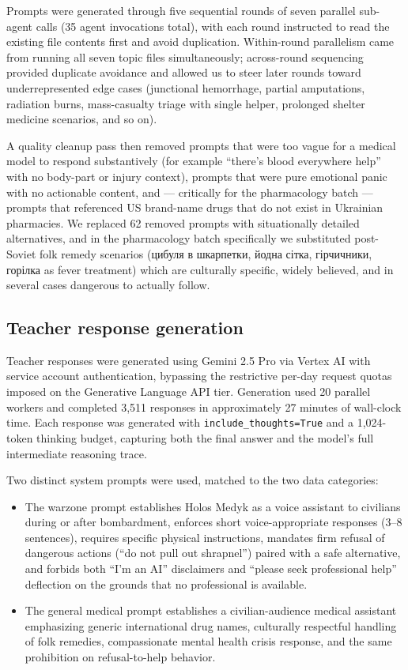 \documentclass{article}
\theoremstyle{plain}
\theoremstyle{definition}
\theoremstyle{remark}
\begin{document}
Prompts were generated through five sequential rounds of seven parallel sub-agent calls (35 agent invocations total), with each round instructed to read the existing file contents first and avoid duplication. Within-round parallelism came from running all seven topic files simultaneously; across-round sequencing provided duplicate avoidance and allowed us to steer later rounds toward underrepresented edge cases (junctional hemorrhage, partial amputations, radiation burns, mass-casualty triage with single helper, prolonged shelter medicine scenarios, and so on).

A quality cleanup pass then removed prompts that were too vague for a medical model to respond substantively (for example ``there's blood everywhere help'' with no body-part or injury context), prompts that were pure emotional panic with no actionable content, and --- critically for the pharmacology batch --- prompts that referenced US brand-name drugs that do not exist in Ukrainian pharmacies. We replaced 62 removed prompts with situationally detailed alternatives, and in the pharmacology batch specifically we substituted post-Soviet folk remedy scenarios (цибуля в шкарпетки, йодна сітка, гірчичники, горілка as fever treatment) which are culturally specific, widely believed, and in several cases dangerous to actually follow.

\subsection{Teacher response generation}

Teacher responses were generated using Gemini 2.5 Pro via Vertex AI with service account authentication, bypassing the restrictive per-day request quotas imposed on the Generative Language API tier. Generation used 20 parallel workers and completed 3{,}511 responses in approximately 27 minutes of wall-clock time. Each response was generated with \texttt{include\_thoughts=True} and a 1{,}024-token thinking budget, capturing both the final answer and the model's full intermediate reasoning trace.

Two distinct system prompts were used, matched to the two data categories:

\begin{itemize}
\item The warzone prompt establishes Holos Medyk as a voice assistant to civilians during or after bombardment, enforces short voice-appropriate responses (3--8 sentences), requires specific physical instructions, mandates firm refusal of dangerous actions (``do not pull out shrapnel'') paired with a safe alternative, and forbids both ``I'm an AI'' disclaimers and ``please seek professional help'' deflection on the grounds that no professional is available.
\item The general medical prompt establishes a civilian-audience medical assistant emphasizing generic international drug names, culturally respectful handling of folk remedies, compassionate mental health crisis response, and the same prohibition on refusal-to-help behavior.
\end{itemize}
\end{document}
